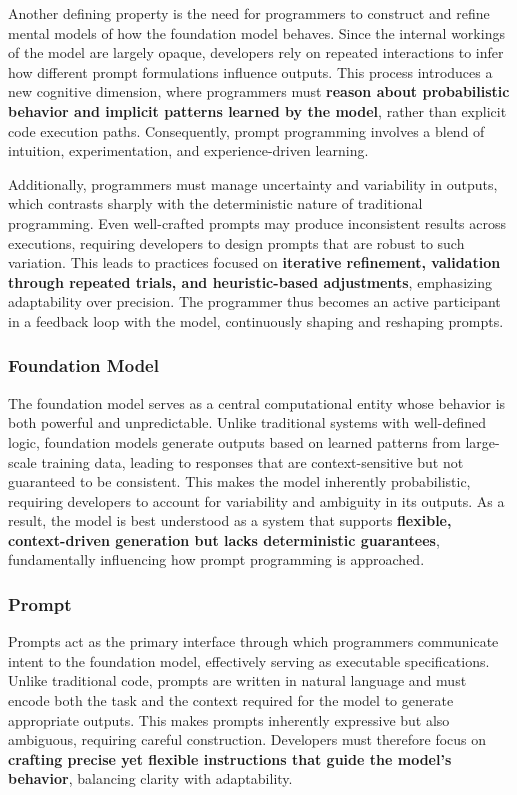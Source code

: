 Another defining property is the need for programmers to construct and refine mental models of how the foundation model behaves. Since the internal workings of the model are largely opaque, developers rely on repeated interactions to infer how different prompt formulations influence outputs. This process introduces a new cognitive dimension, where programmers must \textbf{reason about probabilistic behavior and implicit patterns learned by the model}, rather than explicit code execution paths. Consequently, prompt programming involves a blend of intuition, experimentation, and experience-driven learning.

Additionally, programmers must manage uncertainty and variability in outputs, which contrasts sharply with the deterministic nature of traditional programming. Even well-crafted prompts may produce inconsistent results across executions, requiring developers to design prompts that are robust to such variation. This leads to practices focused on \textbf{iterative refinement, validation through repeated trials, and heuristic-based adjustments}, emphasizing adaptability over precision. The programmer thus becomes an active participant in a feedback loop with the model, continuously shaping and reshaping prompts.

\subsubsection{Foundation Model}
The foundation model serves as a central computational entity whose behavior is both powerful and unpredictable. Unlike traditional systems with well-defined logic, foundation models generate outputs based on learned patterns from large-scale training data, leading to responses that are context-sensitive but not guaranteed to be consistent. This makes the model inherently probabilistic, requiring developers to account for variability and ambiguity in its outputs. As a result, the model is best understood as a system that supports \textbf{flexible, context-driven generation but lacks deterministic guarantees}, fundamentally influencing how prompt programming is approached.

\subsubsection{Prompt}
Prompts act as the primary interface through which programmers communicate intent to the foundation model, effectively serving as executable specifications. Unlike traditional code, prompts are written in natural language and must encode both the task and the context required for the model to generate appropriate outputs. This makes prompts inherently expressive but also ambiguous, requiring careful construction. Developers must therefore focus on \textbf{crafting precise yet flexible instructions that guide the model’s behavior}, balancing clarity with adaptability.

